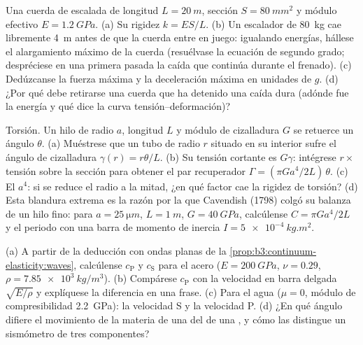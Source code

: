 \begin{exercise}[$\star\star$]\label{exo:b3:continuum-elasticity:7}
Una cuerda de escalada de longitud $L = \qty{20}{m}$, sección $S =
\qty{80}{mm^2}$ y módulo efectivo $E = \qty{1.2}{GPa}$. (a) Su
rigidez $k = ES/L$. (b) Un escalador de \qty{80}{kg} cae libremente
\qty{4}{m} antes de que la cuerda entre en juego: igualando energías, hállese
el alargamiento máximo de la cuerda (resuélvase la ecuación de segundo grado;
despréciese en una primera pasada la caída que continúa durante el frenado).
(c) Dedúzcanse la fuerza máxima y la deceleración máxima en unidades de $g$.
(d) ¿Por qué debe retirarse una cuerda que ha detenido una caída dura
(adónde fue la energía y qué dice la curva tensión--deformación)?
\end{exercise}

\begin{exercise}[$\star\star$]\label{exo:b3:continuum-elasticity:8}
Torsión. Un hilo de radio $a$, longitud $L$ y módulo de cizalladura $G$ se
retuerce un ángulo $\theta$. (a) Muéstrese que un tubo de radio $r$ situado
en su interior sufre el ángulo de cizalladura $\gamma(r) = r\theta/L$. (b) Su
tensión cortante es $G\gamma$: intégrese $r \times$ tensión sobre la sección
para obtener el par recuperador $\Gamma = (\pi Ga^4/2L)\,\theta$. (c) El
$a^4$: si se reduce el radio a la mitad, ¿en qué factor cae la rigidez de
torsión? (d) Esta blandura extrema es la razón por la que Cavendish (1798)
colgó su balanza de un hilo fino: para $a = \qty{25}{\micro m}$, $L =
\qty{1}{m}$, $G = \qty{40}{GPa}$, calcúlense $C = \pi Ga^4/2L$ y el periodo con
una barra de momento de inercia $I = \qty{5e-4}{kg.m^2}$.
\end{exercise}

\begin{exercise}[$\star\star$]\label{exo:b3:continuum-elasticity:9}
(a) A partir de la deducción con ondas planas de la
\cref{prop:b3:continuum-elasticity:waves}, calcúlense $c_{\text{P}}$ y
$c_{\text{S}}$ para el acero ($E = \qty{200}{GPa}$, $\nu = 0.29$, $\rho =
\qty{7.85e3}{kg/m^3}$). (b) Compárese $c_{\text{P}}$ con la velocidad en
barra delgada $\sqrt{E/\rho}$ y explíquese la diferencia en una frase. (c)
Para el agua ($\mu = 0$, módulo de compresibilidad \qty{2.2}{GPa}): la
velocidad S y la velocidad P. (d) ¿En qué ángulo difiere el movimiento de la
materia de una  del de una , y cómo las distingue un sismómetro
de tres componentes?
\end{exercise}

